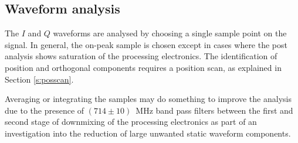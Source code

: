 \subsection{Waveform analysis}
The $I$ and $Q$ waveforms are analysed by choosing a single sample point on the signal. In general, the on-peak sample is chosen except in cases where the post analysis shows saturation of the processing electronics. The identification of position and orthogonal components requires a position scan, as explained in Section \ref{s:posscan}.\par
Averaging or integrating the samples may do something to improve the analysis due to the presence of $(714\pm10)$~MHz band pass filters between the first and second stage of downmixing of the processing electronics as part of an investigation into the reduction of large unwanted static waveform components.\par
